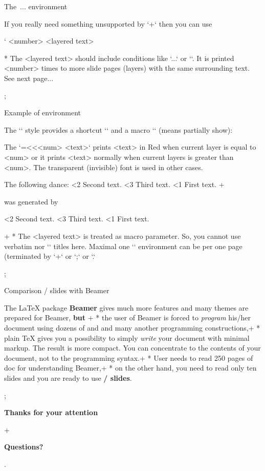 \sec The \code{\\layers}\,...\code{\\endlayers} environment

If you really need something unsupported by `\pg+` then you can use 

\begtt \catcode`
\layers <number>
<layered text>
\endlayers
\endtt 

* The <layered text> should include conditions like
  `\ifnum\layernum...` or `\ifcase\layernum`. 
  It is printed <number> times to more slide pages (layers) with the same
  surrounding text. See next page... 

\pg; %

\sec Example of \code{\\layers} environment

The `\slides` style provides a shortcut `\use` and a macro `\pshow` (means
partially show):

\begtt
\def\use#1#2{\ifnum\layernum#1\relax#2\fi}
\def\pshow#1{\use{=#1}\Red \use{<#1}\Transparent \ignorespaces}
\endtt

The `{\pshow<num> <text>}` prints <text> in Red when current layer is equal
to <num> or it prints <text> normally when current layers is greater than <num>.
The transparent (invisible) font is used in other cases.

The following dance:
{\pshow2 Second text.} {\pshow3 Third text.} {\pshow1 First text.} 
\endlayers
\pg+

was generated by

\begtt
{}
{\pshow2 Second text.} {\pshow3 Third text.} {\pshow1 First text.} 
\endlayers
\endtt

\pg+
* The <layered text> is treated as macro parameter. So, you cannot use verbatim
  nor `\sec` titles here. Maximal one `\layers` environment can be per one 
  page (terminated by `\pg+` or `\pg;` or `\pg.`

\pg; %

\sec Comparison \OpTeX/ slides with Beamer

The \LaTeX{} package {\bf\Blue Beamer} gives much more features and many themes
are prepared for Beamer, {\bf\Red but}
\pg+
* the user of Beamer is forced to {\em program} his/her document using 
  dozens of \code{\\begin{foo}} and \code{\\end{foo}} and many another
  programming constructions,\pg+
* plain \TeX{} gives you a possibility to simply 
  {\em write} your document with minimal markup. The result is more compact.
  You can concentrate to the contents of your document, not to the
  programming syntax.\pg+
* User needs to read 250 pages of doc for understanding Beamer,\pg+
* on the other hand, you need to read only ten 
  slides
  and you are ready to use {\bf\Blue\OpTeX/ slides}.

\pg; %

\null
\vskip2cm
\centerline{\typosize[35/40]\bf Thanks for your attention}\pg+

\vskip2cm
\centerline{\Blue\typosize[60/70]\bf Questions?}

\pg. %

